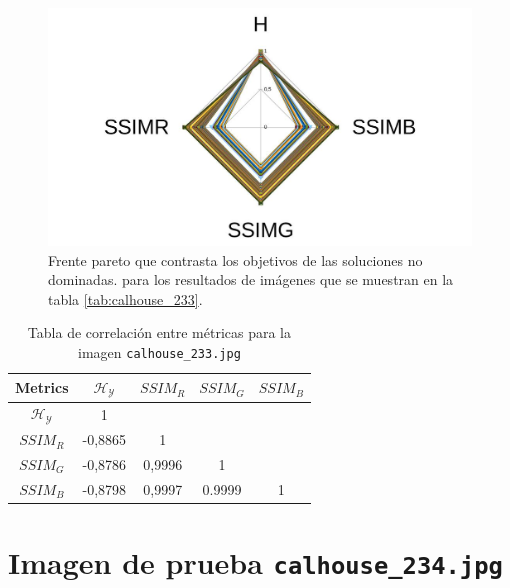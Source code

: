     \begin{figure}[H]
    \centering
    \includegraphics[width=\textwidth]{./Figures/calhouse_233/calhouse_233_2.jpg}
    \caption{Frente pareto que contrasta los objetivos de las soluciones no dominadas. para los resultados de imágenes que se muestran en la tabla \ref{tab:calhouse_233}.}
    \label{fig:calhouse2332fp}
    \end{figure}

\begin{table}[H]
\setlength{\abovecaptionskip}{2pt plus 3pt minus 2pt} %
\caption[Parámetros de entrada para $MOPSO$]{Tabla de correlación entre métricas para la imagen \texttt{calhouse\_233.jpg}}
\begin{center}
 \begin{tabular}{||c | c c c c||} 
 \hline
Metrics & $\mathscr{H_Y}$ & $SSIM_R$ & $SSIM_G$ & $SSIM_B$ \\ 
\hline
$\mathscr{H_Y}$ & 1 &  &  & \\ 
\hline
$SSIM_R$ & -0,8865 & 1 &  \\ 
\hline
$SSIM_G$ & -0,8786 & 0,9996  & 1  & \\ 
\hline
$SSIM_B$ & -0,8798 & 0,9997  & 0.9999  & 1 \\ 
\hline
\end{tabular}
\end{center}
\label{table:correlacion}
\end{table}

\section{Imagen de prueba \texttt{calhouse\_234.jpg}}

